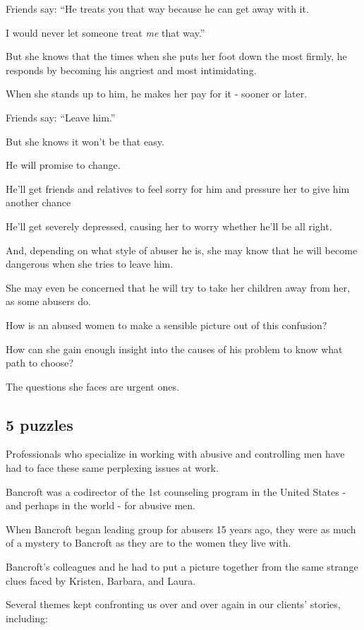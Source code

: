 \documentclass[oneside]{article}
\numberwithin{equation}{section}
\begin{document}
Friends say: ``He treats you that way because he can get away with it.

I would never let someone treat \textit{me} that way.''

But she knows that the times when she puts her foot down the most firmly, he responds by becoming his angriest and most intimidating.

When she stands up to him, he makes her pay for it - sooner or later.

Friends say: ``Leave him.''

But she knows it won't be that easy.

He will promise to change.

He'll get friends and relatives to feel sorry for him and pressure her to give him another chance

He'll get severely depressed, causing her to worry whether he'll be all right.

And, depending on what style of abuser he is, she may know that he will become dangerous when she tries to leave him.

She may even be concerned that he will try to take her children away from her, as some abusers do.

%
How is an abused women to make a sensible picture out of this confusion?

How can she gain enough insight into the causes of his problem to know what path to choose?

The questions she faces are urgent ones.

\subsection{5 puzzles}
Professionals who specialize in working with abusive and controlling men have had to face these same perplexing issues at work.

Bancroft was a codirector of the 1st counseling program in the United States - and perhaps in the world - for abusive men.

When Bancroft began leading group for abusers 15 years ago, they were as much of a mystery to Bancroft as they are to the women they live with.

Bancroft's colleagues and he had to put a picture together from the same strange clues faced by Kristen, Barbara, and Laura.

%
Several themes kept confronting us over and over again in our clients' stories, including:
\end{document}
